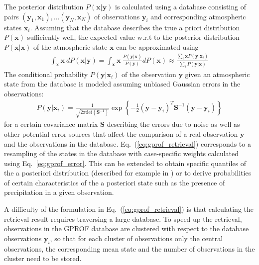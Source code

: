 \documentclass[a4paper,11pt,bibtotoc]{scrartcl}
\begin{document}
 The posterior distribution $P(\mathbf{x} | \mathbf{y})$ is calculated using
a database consisting of pairs
$(\mathbf{y}_1, \mathbf{x}_1), \ldots (\mathbf{y}_N, \mathbf{x}_N)$
of observations $\mathbf{y}_i$ and corresponding atmospheric states
$\mathbf{x}_i$. Assuming that the database describes the true a priori
distribution $P(\mathbf{x})$ sufficiently well, the expected
value w.r.t to the posterior distribution $P(\mathbf{x} | \mathbf{x})$ of the
atmospheric state $\mathbf{x}$ can be approximated using
\begin{align}\label{eq:gprof_retrieval}
  \int_{\mathbf{x} } \mathbf{x}\: dP(\mathbf{x} | \mathbf{y}) =
  \int_{\mathbf{x} } \mathbf{x}\: \frac{P(\mathbf{y} | \mathbf{x})}{P(\mathbf{y})} dP(\mathbf{x}) \approx
  \frac{\sum_i \mathbf{x} P(\mathbf{y}|\mathbf{x}_i)}{\sum_i P(\mathbf{y}|\mathbf{x})}
\end{align}
The conditional probability $P(\mathbf{y} | \mathbf{x}_i)$ of the observation
$\mathbf{y}$ given an atmospheric state from the database is modeled assuming
  unbiased  Gaussian errors in the observations:
\begin{align}\label{eq:gprof_error}
  P(\mathbf{y}|\mathbf{x}_i) = \frac{1}{\sqrt{2\pi\text{det}(\mathbf{S}^{-1})}}
  \exp \left \{
  - \frac{1}{2}
  (\mathbf{y} - \mathbf{y}_i)^T \mathbf{S}^{-1}  (\mathbf{y} - \mathbf{y}_i)
  \right \}
\end{align}
for a certain covariance matrix $\mathbf{S}$ describing the errors due to noise
as well as other potential error sources that affect the comparison of a real
observation $\mathbf{y}$ and the observations in the database.
Eq.~(\ref{eq:gprof_retrieval}) corresponds to a resampling of the
states in the database with case-specific weights calculated using
Eq.~\ref{eq:gprof_error}. This can be extended to obtain specific quantiles of
the a posteriori distribution (described for example in \citet{pfreundschuh18})
or to derive probabilities of certain characteristics of the a posteriori state
such as the presence of precipitation in a given observation.

A difficulty of the formulation in Eq.~(\ref{eq:gprof_retrieval}) is that
calculating the retrieval result requires traversing a large database. To
speed up the retrieval, observations in the GPROF database are clustered
with respect to the database observations $\mathbf{y}_i$, so that for each
cluster of observations only the central observations, the corresponding
mean state and the number of observations in the cluster need to be stored.
\end{document}
